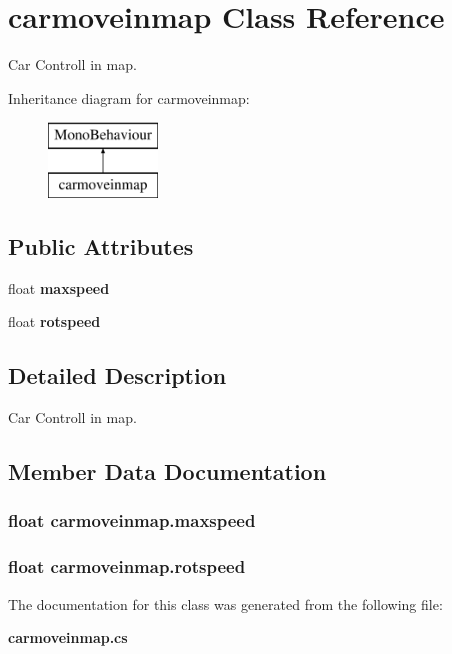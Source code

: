 \section{carmoveinmap Class Reference}
\label{classcarmoveinmap}


Car Controll in map.  


Inheritance diagram for carmoveinmap\+:\begin{figure}[H]
\begin{center}
\leavevmode
\includegraphics[height=2.000000cm]{classcarmoveinmap}
\end{center}
\end{figure}
\subsection*{Public Attributes}
\begin{DoxyCompactItemize}
\item 
float {\bf maxspeed}
\item 
float {\bf rotspeed}
\end{DoxyCompactItemize}


\subsection{Detailed Description}
Car Controll in map. 



\subsection{Member Data Documentation}
\subsubsection[{maxspeed}]{\setlength{\rightskip}{0pt plus 5cm}float carmoveinmap.\+maxspeed}\label{classcarmoveinmap_a8b2a49534de04501b7f202402a71aea3}
\subsubsection[{rotspeed}]{\setlength{\rightskip}{0pt plus 5cm}float carmoveinmap.\+rotspeed}\label{classcarmoveinmap_a4e4ea5b5ee1cfe6a4fa86a3feaa7d797}


The documentation for this class was generated from the following file\+:\begin{DoxyCompactItemize}
\item 
{\bf carmoveinmap.\+cs}\end{DoxyCompactItemize}

